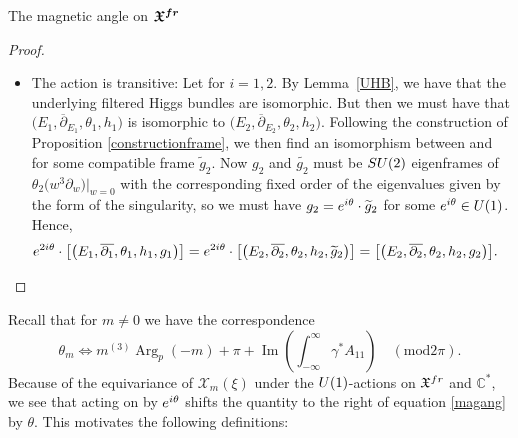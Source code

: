 \documentclass[11pt]{article}
\numberwithin{equation}{section}
\numberwithin{equation}{section}
\newcommand{\MC}{\mathcal{X}_m}
\begin{document}
\begin{subsubsection}{The magnetic angle on $\boldsymbol{\mathfrak{X}^{{\rm fr}}}$}
\begin{proof}
\begin{itemize}
 \item The action is transitive: Let  for $i=1,2$. By Lem\-ma~\ref{UHB}, we have that the underlying filtered Higgs bundles  are isomorphic. But then we must have that $\bigl(E_1,\overline{\partial}_{E_1},\theta_1,h_1\bigr)$ is isomorphic to $\bigl(E_2,\overline{\partial}_{E_2},\theta_2,h_2\bigr)$. Following the construction of Proposition \ref{constructionframe}, we then find an isomorphism between  and~ for some compatible frame $\widetilde{g}_2$. Now $g_2$ and $\widetilde{g_2}$ must be ${\rm SU}(2)$ eigenframes of $\theta_2\bigl(w^3\partial_w\bigr)|_{w=0}$ with the corresponding fixed order of the eigenvalues given by the form of the singularity, so we must have $ g_2={\rm e}^{{\rm i}\theta}\cdot\widetilde{g}_2$ for some ${\rm e}^{{\rm i}\theta} \in {\rm U}(1)$. Hence,
 \begin{equation*}
 {\rm e}^{2{\rm i}\theta}\cdot \bigl[\bigl(E_1,\overline{\partial_1},\theta_1,h_1,g_1\bigr)\bigr]= {\rm e}^{2{\rm i}\theta}\cdot \bigl[\bigl(E_2,\overline{\partial_2},\theta_2,h_2,\widetilde{g}_2\bigr)\bigr]=\bigl[\bigl(E_2,\overline{\partial_2},\theta_2,h_2,g_2\bigr)\bigr].\tag*{\qed}
 \end{equation*}
\end{itemize}\renewcommand{\qed}{}
\end{proof}

Recall that for $m\neq 0$ we have the correspondence
\begin{equation}\label{magang}
 \theta_m \iff m^{(3)}\operatorname{Arg}_p(-m)+\pi +\operatorname{Im}\left(\int_{-\infty}^{\infty}\gamma^*A_{11}\right) \quad (\text{mod} 2\pi).
\end{equation}
Because of the equivariance of $\MC(\xi)$ under the ${\rm U}(1)$-actions on $\mathfrak{X}^{{\rm fr}}$ and $\mathbb{C}^*$, we see that acting on  by ${\rm e}^{{\rm i}\theta}$ shifts the quantity to the right of equation \eqref{magang} by $\theta$. This motivates the following definitions:


\end{subsubsection}
\end{document}
